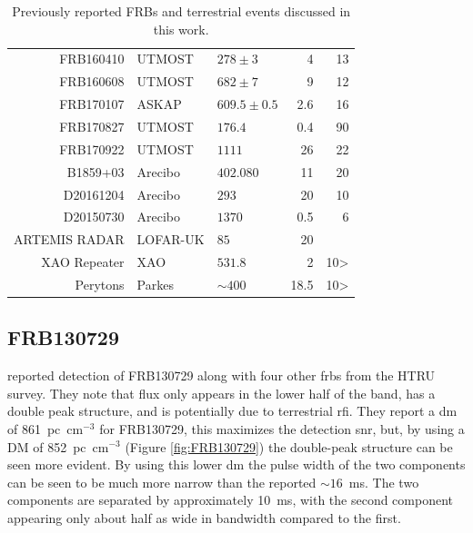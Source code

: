 \documentclass[a4paper,fleqn,usenatbib]{mnras}
\begin{document}
\begin{table}
\begin{tabular}{ r l l r r }
FRB160410 & UTMOST  & $278 \pm 3$        &  4		&	13   \\ 
FRB160608 & UTMOST  & $682 \pm 7$        &  9		&	12   \\ 
FRB170107 & ASKAP   & $609.5 \pm 0.5$    &  2.6		&	16   \\ 
FRB170827 & UTMOST  & $176.4$            &  0.4		&	90   \\ 
FRB170922 & UTMOST  & $1111$             &  26		&	22   \\
\hline
B1859+03  & Arecibo & $402.080$          &  11      &   20   \\ %
D20161204 & Arecibo & $293$              &  20      &   10   \\
D20150730 & Arecibo & $1370$             &  0.5     &    6   \\
ARTEMIS RADAR & LOFAR-UK & $85$          &  20      &        \\
XAO Repeater & XAO  & $531.8$            &  2       &   10>  \\
Perytons  & Parkes  & $\sim400$          &  18.5    &   10>  \\
\end{tabular}
\caption{Previously reported FRBs and terrestrial events discussed in this work.}
\label{tbl:frbs}
\end{table}

\subsection{FRB130729}

\cite{2016MNRAS.460L..30C} reported detection of FRB130729 along with four other
\glspl{frb} from the HTRU survey. They note that flux only appears in the lower
half of the band, has a double peak structure, and is potentially due to
terrestrial \gls{rfi}.  They report a \gls{dm} of 861~pc~cm$^{-3}$ for
FRB130729, this maximizes the detection \gls{snr}, but, by using a DM of
852~pc~cm$^{-3}$ (Figure \ref{fig:FRB130729}) the double-peak structure can be
seen more evident. By using this lower \gls{dm} the pulse width of the two
components can be seen to be much more narrow than the reported $\sim 16$~ms.
The two components are separated by approximately 10~ms, with the second
component appearing only about half as wide in bandwidth compared to the first. 
\end{document}
